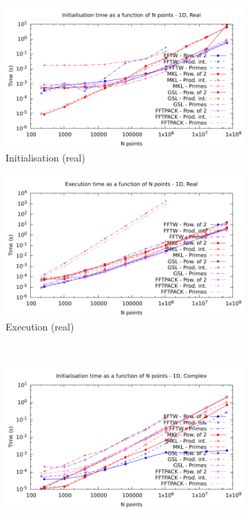 \documentclass[12pt, a4paper]{article} \setlength{\textheight}{24cm}
\begin{document}
\begin{figure}[H]
  \captionsetup{width=0.8\linewidth}
  \centering
  \begin{subfigure}{.5\textwidth}
    \centering
    \includegraphics[width=.9\linewidth]{graphs/1d-init-r.pdf}
    \caption{Initialisation (real)}
    \label{1DRI}
  \end{subfigure}%
  \begin{subfigure}{.5\textwidth} \centering
    \includegraphics[width=.9\linewidth]{graphs/1d-exec-r.pdf}
    \caption{Execution (real)}
    \label{1DR}
  \end{subfigure}\\
  \begin{subfigure}{.5\textwidth}
    \centering
    \includegraphics[width=.9\linewidth]{graphs/1d-init-c.pdf}

\end{subfigure}
\end{figure}
\end{document}
